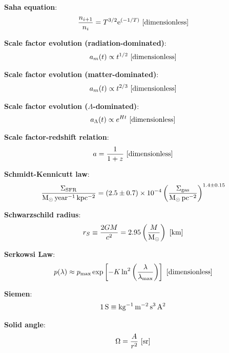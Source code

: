 \documentclass[a4paper,10pt]{article}
\begin{document}
{\noindent}\textbf{Saha equation}:
\begin{align*}
    \frac{n_{i+1}}{n_i} = T^{3/2}\mathrm{e}^{(-1/T)} ~ [{\rm dimensionless}]
\end{align*}

{\noindent}\textbf{Scale factor evolution (radiation-dominated)}:
\begin{align*}
    a_m(t) \propto t^{1/2} ~ [{\rm dimensionless}]
\end{align*}

{\noindent}\textbf{Scale factor evolution (matter-dominated)}:
\begin{align*}
    a_m(t) \propto t^{2/3} ~ [{\rm dimensionless}]
\end{align*}

{\noindent}\textbf{Scale factor evolution ($\Lambda$-dominated)}:
\begin{align*}
    a_\Lambda(t) \propto e^{Ht} ~ [{\rm dimensionless}]
\end{align*}

{\noindent}\textbf{Scale factor-redshift relation}:
\begin{align*}
    a = \dfrac{1}{1+z} ~ [{\rm dimensionless}]
\end{align*}

{\noindent}\textbf{Schmidt-Kennicutt law}:
\begin{align*}
    \frac{\Sigma_\mathrm{SFR}}{{\rm M_\odot\,year^{-1}\,kpc^{-2}}} = (2.5\pm0.7)\times10^{-4} \left(\frac{\Sigma_\mathrm{gas}}{{\rm M_\odot\,pc^{-2}}}\right)^{1.4\pm0.15}
\end{align*}

{\noindent}\textbf{Schwarzschild radius}:
\begin{align*}
    r_S \equiv \frac{2GM}{c^2} = 2.95\left(\frac{M}{{\rm M_\odot}}\right) ~ [{\rm km}]
\end{align*}

{\noindent}\textbf{Serkowsi Law}:
\begin{align*}
    p(\lambda) \approx p_\mathrm{max}\exp \left[-K\ln^2\left(\frac{\lambda}{\lambda_\mathrm{max}}\right)\right] ~ [{\rm dimensionless}]
\end{align*}

{\noindent}\textbf{Siemen}:
\begin{align*}
    {\rm 1\,S \equiv kg^{-1}\,m^{-2}\,s^3\,A^2}
\end{align*}

{\noindent}\textbf{Solid angle}:
\begin{align*}
    \Omega = \frac{A}{r^2} ~ [{\rm sr}]
\end{align*}
\end{document}
